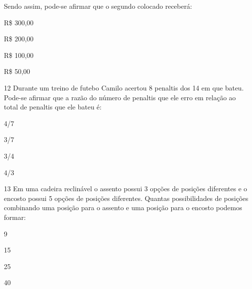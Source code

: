 {Sendo assim, pode-se afirmar que o segundo colocado receberá:

\begin{escolha}
\item
  R\$ 300,00
\item
  R\$ 200,00
\item
  R\$ 100,00
\item
  R\$ 50,00
\end{escolha}


\num{12} Durante um treino de futebo Camilo acertou 8 penaltis dos 14 em
que bateu. Pode-se afirmar que a razão do número de penaltis que ele
erro em relação ao total de penaltis que ele bateu é:

\begin{escolha}
\item
  4/7
\item
  3/7
\item
  3/4
\item
  4/3
\end{escolha}


\num{13} Em uma cadeira reclinável o assento possui 3 opções de posições
diferentes e o encosto possui 5 opções de posições diferentes. Quantas
possibilidades de posições combinando uma posição para o assento e uma
posição para o encosto podemos formar:

\begin{escolha}
\item
  9
\item
  15
\item
  25
\item
  40
\end{escolha}

}
